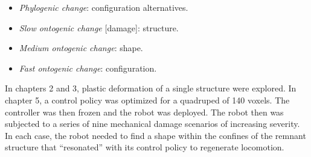 \begin{itemize}
    \item \textit{Phylogenic change}: configuration alternatives.
    \item \textit{Slow ontogenic change} [damage]: structure.
    \item \textit{Medium ontogenic change}: shape.
    \item \textit{Fast ontogenic change}: configuration.
\end{itemize}


\noindent
In chapters 2 and 3, 
plastic deformation of a single structure were explored.
In chapter 5, a control policy was optimized for a quadruped of 140 voxels.
The controller was then frozen and the robot was deployed.
The robot then was subjected to a series of nine mechanical damage scenarios of increasing severity.
In each case, the robot needed to find a shape within the confines of the remnant structure that ``resonated'' with its control policy to regenerate locomotion.






